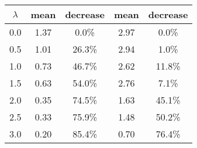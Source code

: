 \begin{tabular}{c||c|c||c|c}
\toprule
 $\lambda$ &  mean & decrease &  mean & decrease \\
\midrule
       0.0 &  1.37 &    0.0\% &  2.97 &    0.0\% \\
       0.5 &  1.01 &   26.3\% &  2.94 &    1.0\% \\
       1.0 &  0.73 &   46.7\% &  2.62 &   11.8\% \\
       1.5 &  0.63 &   54.0\% &  2.76 &    7.1\% \\
       2.0 &  0.35 &   74.5\% &  1.63 &   45.1\% \\
       2.5 &  0.33 &   75.9\% &  1.48 &   50.2\% \\
       3.0 &  0.20 &   85.4\% &  0.70 &   76.4\% \\
\bottomrule
\end{tabular}
